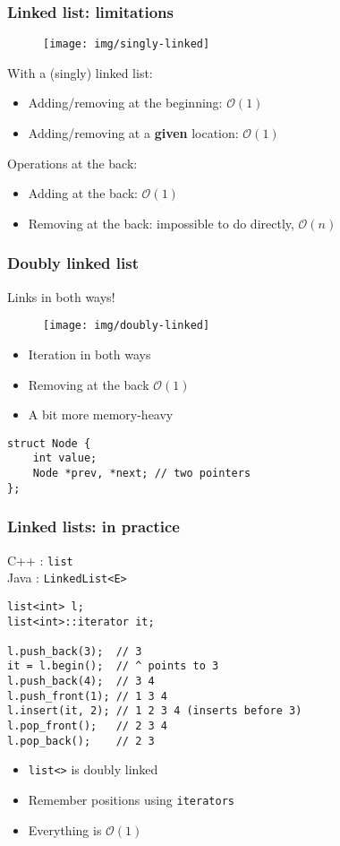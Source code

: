 \documentclass[12pt]{beamer}
\newcommand{\bigoh}[1]{\mathcal{O}\left(#1\right)}
\newcommand{\constant}{\bigoh{1}}
\newcommand{\linear}{\bigoh{n}}
\begin{document}
\begin{frame}[fragile]
\frametitle{Linked list: limitations}
\begin{figure}
\centering
\texttt{[image: img/singly-linked]}
\end{figure}
With a (singly) linked list:
\begin{itemize}
\item Adding/removing at the beginning: $\constant$
\item Adding/removing at a \textbf{given} location: $\constant$
\end{itemize}
Operations at the back:
\begin{itemize}
\item Adding at the back: $\constant$
\item Removing at the back: impossible to do directly, $\linear$
\end{itemize}
\end{frame}

\begin{frame}[fragile]
\frametitle{Doubly linked list}
Links in both ways!
\begin{figure}
\centering
\texttt{[image: img/doubly-linked]}
\end{figure}
\begin{itemize}
\item Iteration in both ways
\item Removing at the back $\constant$
\item A bit more memory-heavy
\end{itemize}
\begin{lstlisting}
struct Node {
    int value;
    Node *prev, *next; // two pointers
};
\end{lstlisting}
\end{frame}

\begin{frame}[fragile]
\frametitle{Linked lists: in practice}
C++ : \texttt{list} \\
Java : \texttt{LinkedList<E>}
\begin{lstlisting}
list<int> l;
list<int>::iterator it;

l.push_back(3);  // 3
it = l.begin();  // ^ points to 3
l.push_back(4);  // 3 4
l.push_front(1); // 1 3 4
l.insert(it, 2); // 1 2 3 4 (inserts before 3)
l.pop_front();   // 2 3 4
l.pop_back();    // 2 3
\end{lstlisting}
\begin{itemize}
\item \texttt{list<>} is doubly linked
\item Remember positions using \texttt{iterators}
\item Everything is $\constant$
\end{itemize}
\end{frame}
\end{document}
